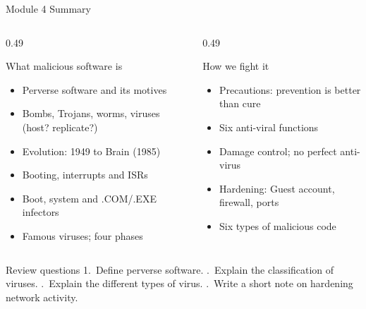 \documentclass[aspectratio=169,11pt,xcolor={table}]{beamer}
\begin{document}
\begin{frame}{Module 4 Summary}
  \begin{columns}[T]
    \begin{column}{0.49\textwidth}
      \begin{block}{What malicious software is}
        \small
        \begin{itemize}\setlength{\itemsep}{0pt}
          \item Perverse software and its motives
          \item Bombs, Trojans, worms, viruses (host? replicate?)
          \item Evolution: 1949 to Brain (1985)
          \item Booting, interrupts and ISRs
          \item Boot, system and .COM\slash.EXE infectors
          \item Famous viruses; four phases
        \end{itemize}
      \end{block}
    \end{column}
    \begin{column}{0.49\textwidth}
      \begin{exampleblock}{How we fight it}
        \small
        \begin{itemize}\setlength{\itemsep}{0pt}
          \item Precautions: prevention is better than cure
          \item Six anti-viral functions
          \item Damage control; no perfect anti-virus
          \item Hardening: Guest account, firewall, ports
          \item Six types of malicious code
        \end{itemize}
      \end{exampleblock}
    \end{column}
  \end{columns}
  \vspace{1mm}
  \begin{alertblock}{Review questions}
    \small
    1.~Define perverse software. .~Explain the classification of viruses. .~Explain the different types of virus. .~Write a short note on hardening network activity.
  \end{alertblock}
\end{frame}
\end{document}
